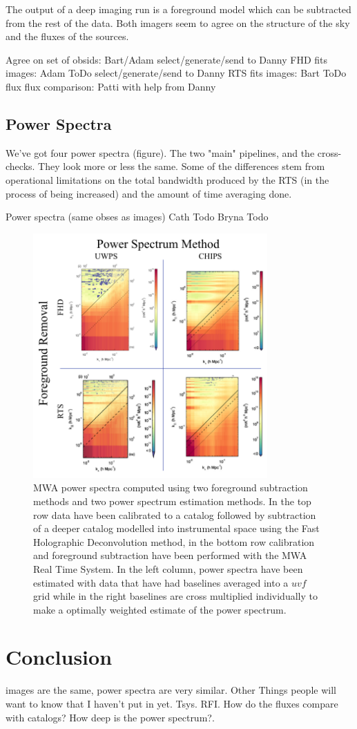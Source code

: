 \documentclass[preprint2]{aastex}
\begin{document}
The output of a deep imaging run is a foreground model which can be subtracted from the rest of the data. Both imagers seem to agree on the structure of the sky and the fluxes of the sources.

Agree on set of obsids: Bart/Adam
select/generate/send to Danny FHD fits images: Adam ToDo  
select/generate/send to Danny RTS fits images: Bart ToDo  
flux flux comparison: Patti with help from Danny




\subsection{Power Spectra}
We've got four power spectra (figure). The two "main" pipelines, and the cross-checks. They look more or less the same. Some of the differences stem from operational limitations on the total bandwidth produced by the RTS (in the process of being increased) and the amount of time averaging done.  

Power spectra (same obses as images)
Cath Todo
Bryna Todo

\begin{figure}[h!]
\begin{center}
\includegraphics[width=0.8\textwidth]{figures/MWA_PS_compare1/MWA_PS_compare.png}
\caption{MWA power spectra computed using two foreground subtraction methods and two power spectrum estimation methods.  In the top row data have been calibrated to a catalog followed by subtraction of a deeper catalog modelled into instrumental space using the Fast Holographic Deconvolution method, in the bottom row calibration and foreground subtraction have been performed with the MWA Real Time System.  In the left column, power spectra have been estimated with data that have had baselines averaged into a $uvf$ grid while in the right baselines are cross multiplied individually to make a optimally weighted estimate of the power spectrum.\label{fig:pspec_compare}}
\end{center}
\end{figure}

\section{Conclusion}
images are the same, power spectra are very similar.
Other Things people will want to know that I haven't put in yet. Tsys. RFI. How do the fluxes compare with catalogs? How deep is the power spectrum?.


\end{document}
